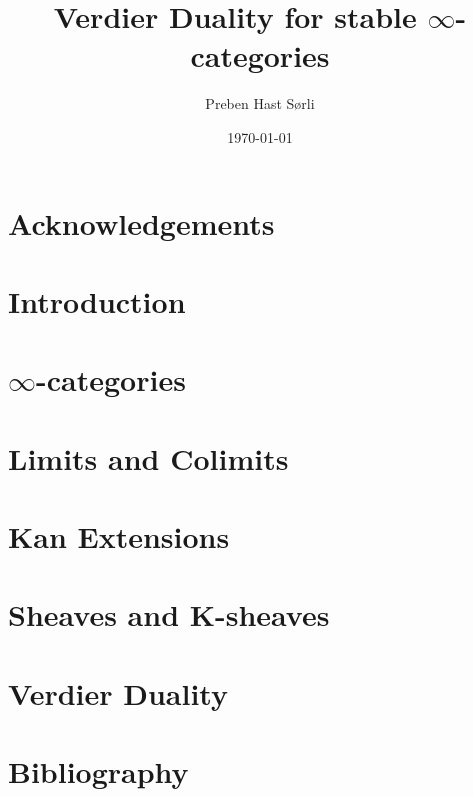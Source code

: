 \documentclass[british,titlepage]{ntnuthesis}
\title{Verdier Duality for stable $\infty$-categories}
\author{Preben Hast Sørli}
\date{\today}
\begin{document}
\tableofcontents

\chapter*{Acknowledgements}
\chapter*{Introduction}

\chapter{$\infty$-categories}\label{infcatchap}

\chapter{Limits and Colimits}\label{limscolims}



\chapter{Kan Extensions}\label{kanchap}

\chapter{Sheaves and K-sheaves}\label{sheavescap}


\chapter{Verdier Duality}\label{verdiercap}

\chapter*{Bibliography}
\printbibliography[heading=none]
\end{document}
